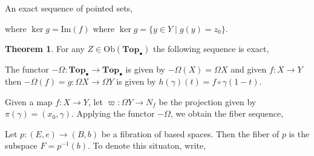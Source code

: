\documentclass[12pt]{extarticle}
\newcommand{\Ob}[1]{\mathrm{Ob}(#1)}
\newcommand{\pTop}{\mathbf{Top}_{\bullet}}
\renewcommand{\Im}[1]{\mathrm{Im}(#1)}
\theoremstyle{definition}
\newtheorem{theorem}{Theorem}[section]
\newenvironment{definition}[1][Definition:]{\begin{trivlist}
\item[\hskip \labelsep {\bfseries #1}]}{\end{trivlist}}
\begin{document}
\begin{definition}
An exact sequence of pointed sets,
\begin{center}
\end{center} 
where $\ker{g} = \Im{f}$ where $\ker{g} = \{y \in Y \mid g(y) = z_0\}$.
\end{definition}

\begin{theorem}
For any $Z \in \Ob{\pTop}$ the following sequence is exact,
\begin{center}
\end{center}  
\end{theorem}

\begin{definition}
The functor $-\Omega : \pTop \to \pTop$ is given by $-\Omega (X) = \Omega X$ and given $f : X \to Y$ then $- \Omega (f) = g : \Omega X \to \Omega Y$ is given by $h(\gamma)(t) = f \circ \gamma(1 - t)$.  
\end{definition}

\begin{definition}
Given a map $f : X \to Y$, let $\varpi : \Omega Y \to N_f$ be the projection given by $\pi(\gamma) = (x_0, \gamma)$. Applying the functor $-\Omega$, we obtain the fiber sequence,
\begin{center}
\end{center} 
\end{definition}

\begin{definition}
Let $p : (E, e) \to (B, b)$ be a fibration of based spaces. Then the fiber of $p$ is the subspace $F = p^{-1}(b)$. To denote this situaton, write,
\begin{center}
\end{center}
\end{definition}
\end{document}
